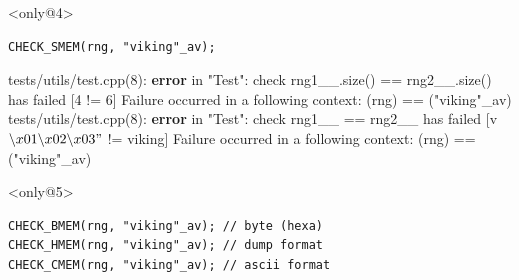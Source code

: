 \documentclass{beamer}
\begin{document}
\begin{frame}[fragile]
\begin{exampleblock}{}<only@4>
\begin{lstlisting}
CHECK_SMEM(rng, "viking"_av);
\end{lstlisting}
{\color{f7}tests/utils/test.cpp(8)}: \textbf{\color{f1}error} in "{\color{f5}Test}":
 {\color{f4}check} {\color{f1}rng1\_\_.size()} {\color{f3}==} {\color{f1}rng2\_\_.size() has} failed [{\color{f6}4} {\color{f3}!=} {\color{f6}6}] \newline
Failure occurred in a following context: \newline
    (rng) == ("viking"\_av)\newline
{\color{f7}tests/utils/test.cpp(8)}: \textbf{\color{f1}error} in "{\color{f5}Test}":
 {\color{f4}check} {\color{f1}rng1\_\_} {\color{f3}==} {\color{f1}rng2\_\_ has} failed [{\color{f6}v}{\color{f1}$\backslash{}x01\backslash{}x02\backslash{}x03"$} {\color{f3}!=} {\color{f6}v}{\color{f1}iking}] \newline
Failure occurred in a following context: \newline
    (rng) == ("viking"\_av)
\end{exampleblock}

\begin{exampleblock}{}<only@5>
\begin{lstlisting}
CHECK_BMEM(rng, "viking"_av); // byte (hexa)
CHECK_HMEM(rng, "viking"_av); // dump format
CHECK_CMEM(rng, "viking"_av); // ascii format
\end{lstlisting}
\end{exampleblock}
\end{frame}
\end{document}
